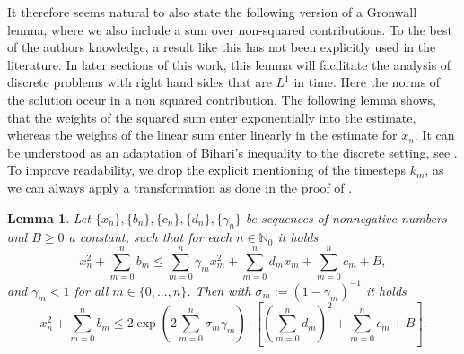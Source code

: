 \documentclass{m2an}
\newtheorem{lemma}[theorem]{Lemma}
\newcommand{\N}{\mathbb{N}}
\begin{document}
It therefore seems natural to also state the following version of a Gronwall lemma,
where we also include a sum over non-squared contributions.
To the best of the authors knowledge, a result like this has not been explicitly used in the literature.
In later sections of this work, this lemma will facilitate the analysis of discrete problems
with right hand sides that are $L^1$ in time. Here the norms of the solution occur in a
non squared contribution.
The following lemma shows, that the weights of the squared sum enter exponentially into the 
estimate, whereas the weights of the linear sum enter linearly in the estimate for $x_n$.
It can be understood as an adaptation of Bihari's inequality to the discrete setting, see
\cite{bihari_generalization_1956,lipovan_retarded_2000}.
To improve readability, we drop the explicit mentioning of the timesteps $k_m$, as we can always apply
a transformation as done in the proof of .
\begin{lemma}\label{thm:discrete_gronwall_quadlinear}
  Let $\{x_n\}, \{b_n\}, \{c_n\}, \{d_n\}, \{\gamma_n\}$ be sequences of nonnegative numbers
  and $B \ge 0$ a constant, such that for each $n \in \N_0$ it holds
  \begin{equation*}
    x_n^2 + \sum_{m=0}^n b_m \le \sum_{m=0}^n \gamma_m x_m^2 
    + \sum_{m=0}^n d_m x_m
    + \sum_{m=0}^n c_m + B,
  \end{equation*}
  and $\gamma_m < 1$ for all $m \in \{0,...,n\}$. Then with $\sigma_m := (1 - \gamma_m)^{-1}$ it holds
  \begin{equation*}
    x_n^2 + \sum_{m=0}^n b_m \le 2\exp \left(2 \sum_{m=0}^n \sigma_m \gamma_m \right)\cdot
    \left[\left(\sum_{m=0}^n d_m \right)^2 + \sum_{m=0}^n c_m + B\right].
  \end{equation*}
\end{lemma}
\end{document}
